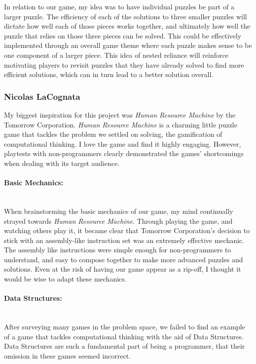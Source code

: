 In relation to our game, my idea was to have individual puzzles be part of a larger puzzle. The efficiency of each of the solutions to three smaller puzzles will dictate how well each of those pieces works together, and ultimately how well the puzzle that relies on those three pieces can be solved. This could be effectively implemented through an overall game theme where each puzzle makes sense to be one component of a larger piece. This idea of nested reliance will reinforce motivating players to revisit puzzles that they have already solved to find more efficient solutions, which can in turn lead to a better solution overall.\\

\subsubsection{Nicolas LaCognata}
My biggest inspiration for this project was \textit{Human Resource Machine} by the Tomorrow Corporation. \textit{Human Resource Machine} is a charming little puzzle game that tackles the problem we settled on solving, the gamification of computational thinking. I love the game and find it highly engaging. However, playtests with non-programmers clearly demonstrated the games' shortcomings when dealing with its target audience.

\paragraph{Basic Mechanics:} ~\\
When brainstorming the basic mechanics of our game, my mind continually strayed towards \textit{Human Resource Machine}. Through playing the game, and watching others play it, it became clear that Tomorrow Corporation's decision to stick with an assembly-like instruction set was an extremely effective mechanic.\\

The assembly like instructions were simple enough for non-programmers to understand, and easy to compose together to make more advanced puzzles and solutions. Even at the risk of having our game appear as a rip-off, I thought it would be wise to adapt these mechanics.\\

\paragraph{Data Structures:} ~\\
After surveying many games in the problem space, we failed to find an example of a game that tackles computational thinking with the aid of Data Structures. Data Structures are such a fundamental part of being a programmer, that their omission in these games seemed incorrect.\\

